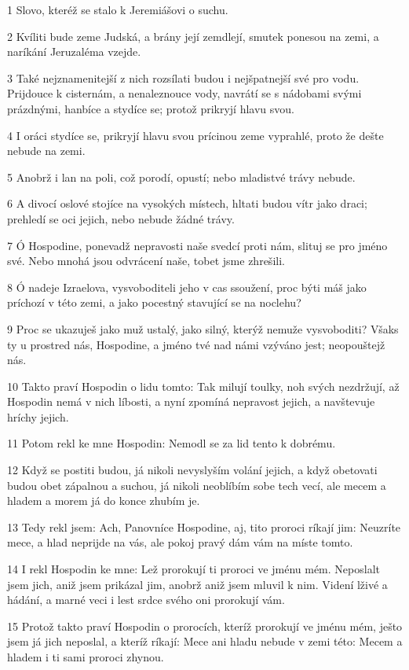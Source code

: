 \par 1 Slovo, kteréž se stalo k Jeremiášovi o suchu.
\par 2 Kvíliti bude zeme Judská, a brány její zemdlejí, smutek ponesou na zemi, a naríkání Jeruzaléma vzejde.
\par 3 Také nejznamenitejší z nich rozsílati budou i nejšpatnejší své pro vodu. Prijdouce k cisternám, a nenaleznouce vody, navrátí se s nádobami svými prázdnými, hanbíce a stydíce se; protož prikryjí hlavu svou.
\par 4 I oráci stydíce se, prikryjí hlavu svou prícinou zeme vyprahlé, proto že dešte nebude na zemi.
\par 5 Anobrž i lan na poli, což porodí, opustí; nebo mladistvé trávy nebude.
\par 6 A divocí oslové stojíce na vysokých místech, hltati budou vítr jako draci; prehledí se oci jejich, nebo nebude žádné trávy.
\par 7 Ó Hospodine, ponevadž nepravosti naše svedcí proti nám, slituj se pro jméno své. Nebo mnohá jsou odvrácení naše, tobet jsme zhrešili.
\par 8 Ó nadeje Izraelova, vysvoboditeli jeho v cas ssoužení, proc býti máš jako príchozí v této zemi, a jako pocestný stavující se na noclehu?
\par 9 Proc se ukazuješ jako muž ustalý, jako silný, kterýž nemuže vysvoboditi? Všaks ty u prostred nás, Hospodine, a jméno tvé nad námi vzýváno jest; neopouštejž nás.
\par 10 Takto praví Hospodin o lidu tomto: Tak milují toulky, noh svých nezdržují, až Hospodin nemá v nich líbosti, a nyní zpomíná nepravost jejich, a navštevuje hríchy jejich.
\par 11 Potom rekl ke mne Hospodin: Nemodl se za lid tento k dobrému.
\par 12 Když se postiti budou, já nikoli nevyslyším volání jejich, a když obetovati budou obet zápalnou a suchou, já nikoli neoblíbím sobe tech vecí, ale mecem a hladem a morem já do konce zhubím je.
\par 13 Tedy rekl jsem: Ach, Panovníce Hospodine, aj, tito proroci ríkají jim: Neuzríte mece, a hlad neprijde na vás, ale pokoj pravý dám vám na míste tomto.
\par 14 I rekl Hospodin ke mne: Lež prorokují ti proroci ve jménu mém. Neposlalt jsem jich, aniž jsem prikázal jim, anobrž aniž jsem mluvil k nim. Videní lživé a hádání, a marné veci i lest srdce svého oni prorokují vám.
\par 15 Protož takto praví Hospodin o prorocích, kteríž prorokují ve jménu mém, ješto jsem já jich neposlal, a kteríž ríkají: Mece ani hladu nebude v zemi této: Mecem a hladem i ti sami proroci zhynou.
